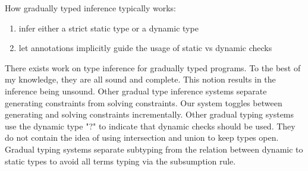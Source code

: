 \documentclass[sigplan,screen]{acmart}
\begin{document}
How gradually typed inference typically works:
\begin{enumerate}
  \item infer either a strict static type or a dynamic type
  \item let annotations implicitly guide the usage of static vs dynamic checks 
\end{enumerate}


There exists work on type inference for gradually typed programs.
To the best of my knowledge, they are all sound and complete.
This notion results in the inference being unsound.
Other gradual type inference systems separate 
generating constraints from solving constraints.
Our system toggles between generating and solving constraints incrementally.
Other gradual typing systems use the dynamic type "?" to indicate 
that dynamic checks should be used.
They do not contain the idea of using intersection and union to keep types open.
Gradual typing systems separate subtyping from the relation 
between dynamic to static types to avoid all terms typing via the subsumption rule.
\end{document}
